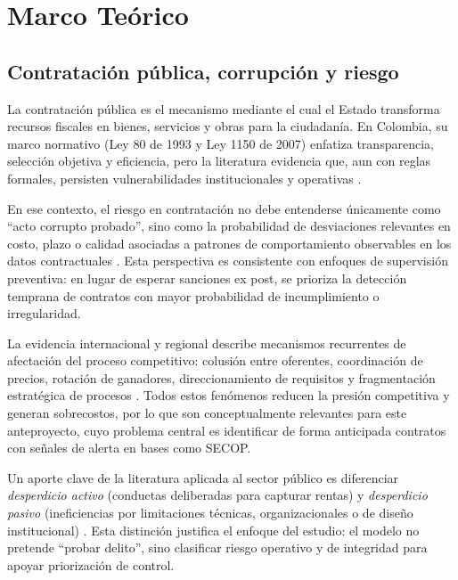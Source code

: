 \section{Marco Teórico}

\subsection{Contratación pública, corrupción y riesgo}

La contratación pública es el mecanismo mediante el cual el Estado transforma recursos fiscales en bienes, servicios y obras para la ciudadanía. En Colombia, su marco normativo (Ley 80 de 1993 y Ley 1150 de 2007) enfatiza transparencia, selección objetiva y eficiencia, pero la literatura evidencia que, aun con reglas formales, persisten vulnerabilidades institucionales y operativas \cite{mendieta2022regimen, sierra2025contratacion}.

En ese contexto, el riesgo en contratación no debe entenderse únicamente como ``acto corrupto probado'', sino como la probabilidad de desviaciones relevantes en costo, plazo o calidad asociadas a patrones de comportamiento observables en los datos contractuales \cite{salazar2024vigia, calderon2025contratacion}. Esta perspectiva es consistente con enfoques de supervisión preventiva: en lugar de esperar sanciones ex post, se prioriza la detección temprana de contratos con mayor probabilidad de incumplimiento o irregularidad.

La evidencia internacional y regional describe mecanismos recurrentes de afectación del proceso competitivo: colusión entre oferentes, coordinación de precios, rotación de ganadores, direccionamiento de requisitos y fragmentación estratégica de procesos \cite{decarolis2022corruption, spagnolo2024bidrigging, zhang2022collusion}. Todos estos fenómenos reducen la presión competitiva y generan sobrecostos, por lo que son conceptualmente relevantes para este anteproyecto, cuyo problema central es identificar de forma anticipada contratos con señales de alerta en bases como SECOP.

Un aporte clave de la literatura aplicada al sector público es diferenciar \textit{desperdicio activo} (conductas deliberadas para capturar rentas) y \textit{desperdicio pasivo} (ineficiencias por limitaciones técnicas, organizacionales o de diseño institucional) \cite{salazar2024vigia}. Esta distinción justifica el enfoque del estudio: el modelo no pretende ``probar delito'', sino clasificar riesgo operativo y de integridad para apoyar priorización de control.

